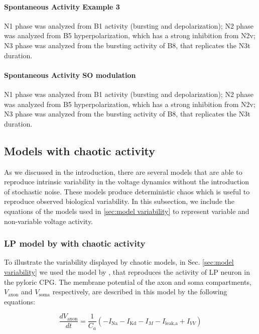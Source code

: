 \paragraph{Spontaneous Activity Example 3}
N1 phase was analyzed from B1 activity (bursting and depolarization); N2 phase was analyzed from B5 hyperpolarization, which has a strong inhibition from N2v; N3 phase was analyzed from the bursting activity of B8, that replicates the N3t duration. 

\paragraph{Spontaneous Activity SO modulation}
N1 phase was analyzed from B1 activity (bursting and depolarization); N2 phase was analyzed from B5 hyperpolarization, which has a strong inhibition from N2v; N3 phase was analyzed from the bursting activity of B8, that replicates the N3t duration. 

\subsection{Models with chaotic activity}
\label{sec:model variability equations}
As we discussed in the introduction, there are several models that are able to reproduce intrinsic variability in the voltage dynamics without the introduction of stochastic noise. These models produce deterministic chaos which is useful to reproduce observed biological variability. In this subsection, we include the equations of the models used in \ref{sec:model variability} to represent variable and non-variable voltage activity.
\subsubsection{LP model by \textcite{nowotny_probing_2008} with chaotic activity}

To illustrate the variability displayed by chaotic models, in Sec. \ref{sec:model variability} we used the model by \textcite{nowotny_probing_2008}, that reproduces the activity of LP neuron in the pyloric CPG. The membrane potential of the axon and soma compartments, $V_{\text{axon}}$ and $V_{\text{soma}}$ respectively, are described in this model by the following equations:

\begin{equation}
	\frac{dV_{\text{axon}}}{dt} = \frac{1}{C_a} \left( -I_{\text{Na}} - I_{\text{Kd}} - I_M - I_{\text{leak,a}} + I_{VV} \right)
\end{equation}

